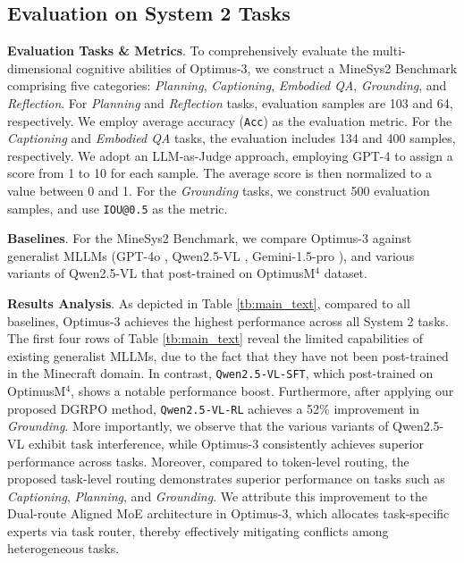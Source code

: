 \subsection{Evaluation on System 2 Tasks}
\noindent\textbf{Evaluation Tasks \& Metrics}. To comprehensively evaluate the multi-dimensional cognitive abilities of Optimus-3, we construct a MineSys2 Benchmark comprising five categories: \textit{Planning}, \textit{Captioning}, \textit{Embodied QA}, \textit{Grounding}, and \textit{Reflection}. For \textit{Planning} and \textit{Reflection} tasks, evaluation samples are 103 and 64, respectively. We employ average accuracy (\texttt{Acc}) as the evaluation metric. For the \textit{Captioning} and \textit{Embodied QA} tasks, the evaluation includes 134 and 400 samples, respectively. We adopt an LLM-as-Judge \cite{li2024generation} approach, employing GPT-4 \cite{gpt4} to assign a score from 1 to 10 for each sample. The average score is then normalized to a value between 0 and 1. For the \textit{Grounding} tasks, we construct 500 evaluation samples, and use \texttt{IOU@0.5} \cite{chen2023advancing} as the metric.


\noindent\textbf{Baselines}. For the MineSys2 Benchmark, we compare Optimus-3 against generalist MLLMs (GPT-4o \cite{gpt4}, Qwen2.5-VL \cite{bai2025qwen2}, Gemini-1.5-pro \cite{team2024gemini}), and various variants of Qwen2.5-VL \cite{bai2025qwen2} that post-trained on OptimusM$^4$ dataset.



\noindent\textbf{Results Analysis}.  As depicted in Table \ref{tb:main_text}, compared to all baselines, Optimus-3 achieves the highest performance across all System 2 tasks. The first four rows of Table \ref{tb:main_text} reveal the limited capabilities of existing generalist MLLMs, due to the fact that they have not been post-trained in the Minecraft domain. In contrast, \texttt{Qwen2.5-VL-SFT}, which post-trained on OptimusM$^4$, shows a notable performance boost. Furthermore, after applying our proposed DGRPO method, \texttt{Qwen2.5-VL-RL} achieves a 52\% improvement in \textit{Grounding}. More importantly, we observe that the various variants of Qwen2.5-VL exhibit task interference, while Optimus-3 consistently achieves superior performance across tasks. Moreover, compared to token-level routing, the proposed task-level routing demonstrates superior performance on tasks such as \textit{Captioning}, \textit{Planning}, and \textit{Grounding}. We attribute this improvement to the Dual-route Aligned MoE architecture in Optimus-3, which allocates task-specific experts via task router, thereby effectively mitigating conflicts among heterogeneous tasks. 

